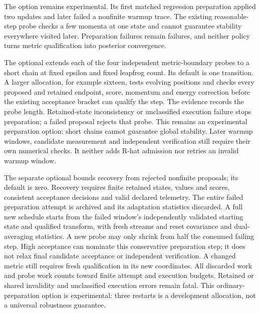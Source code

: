 The option remains experimental. Its first matched regression preparation
applied two updates and later failed a nonfinite warmup trace. The existing
reasonable-step probe checks a few momenta at one state and cannot guarantee
stability everywhere visited later. Preparation failures remain failures,
and neither policy turns metric qualification into posterior convergence.

The optional  extends each of the four independent
metric-boundary probes to a short chain at fixed epsilon and fixed leapfrog
count. Its default is one transition. A larger allocation, for example sixteen,
tests evolving positions and checks every proposed and retained endpoint,
score, momentum and energy correction before the existing acceptance bracket
can qualify the step. The evidence records the probe length. Retained-state
inconsistency or unclassified execution failure stops preparation; a failed
proposal rejects that probe. This remains an experimental preparation option:
short chains cannot guarantee global stability. Later warmup windows, candidate
measurement and independent verification still require their own numerical
checks. It neither adds R-hat admission nor retries an invalid warmup window.

The separate optional  bounds recovery from
rejected nonfinite proposals; its default is zero. Recovery requires finite
retained states, values and scores, consistent acceptance decisions and valid
declared telemetry. The entire failed preparation attempt is archived and its
adaptation statistics discarded. A full new schedule starts from the failed
window's independently validated starting state and qualified transform, with
fresh streams and reset covariance and dual-averaging statistics. A new probe
may only shrink from half the consumed failing step. High acceptance can
nominate this conservative preparation step; it does not relax final candidate
acceptance or independent verification. A changed metric still requires fresh
qualification in its new coordinates. All discarded work and probe work counts
toward finite attempt and execution budgets. Retained or shared invalidity and
unclassified execution errors remain fatal. This ordinary-preparation option
is experimental: three restarts is a development allocation, not a universal
robustness guarantee.




